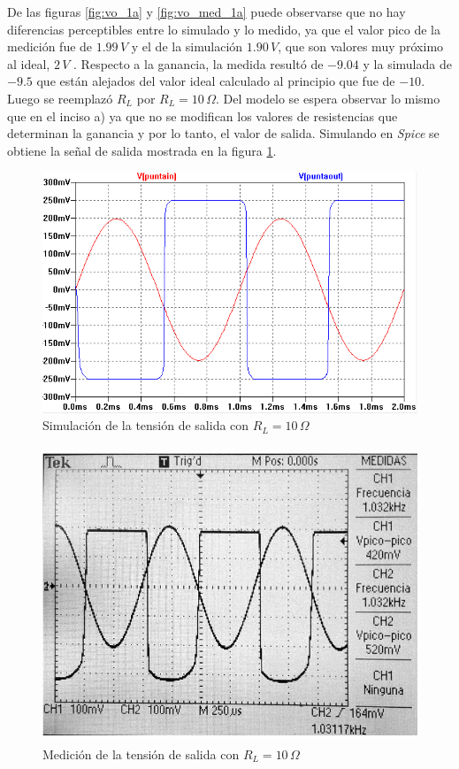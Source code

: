 \documentclass[10pt,spanish,a4paper,openany,notitlepage]{article}
\begin{document}
\begin{enumerate}
\begin{enumerate}
    De las figuras \ref{fig:vo_1a} y \ref{fig:vo_med_1a} puede observarse que no hay diferencias
    perceptibles entre lo simulado y lo medido, ya que el valor pico de la medición fue de $1.99\,\unit{V}$ y el de la simulación $1.90\,\unit{V}$, que son valores muy próximo al ideal, $2\,\unit{V}$ . Respecto a la ganancia, la medida resultó de $-9.04$ y la simulada de $-9.5$ que están alejados del valor ideal calculado al principio que fue de $-10$.\\
    
    
    Luego se reemplazó $R_L$ por $R_L = 10\,\unit{\Omega}$. Del modelo se espera observar lo mismo que en el inciso a) ya que no se modifican los valores de resistencias que determinan la ganancia y por lo tanto, el valor de salida. Simulando en \emph{Spice} se obtiene la señal de salida mostrada en la figura \ref{fig:vo_1aRL}.
 
    
    \begin{figure}[H]
    \centering
    \includegraphics[scale=0.8]{simulaciones/A1A-Rl10ohm.png}
    \caption{Simulación de la tensión de salida con $R_L = 10\,\unit{\Omega}$}
    \label{fig:vo_1aRL}
    \end{figure}
    
    \begin{figure}[H]
    \centering
    \includegraphics[width=350pt, height=250pt]{mediciones/A1a-10R-ultima_preg.jpg}
    \caption{Medición de la tensión de salida con $R_L = 10\,\unit{\Omega}$}
    \label{fig:vo_med_1aRL}
    \end{figure}
    

\end{enumerate}
\end{enumerate}
\end{document}
